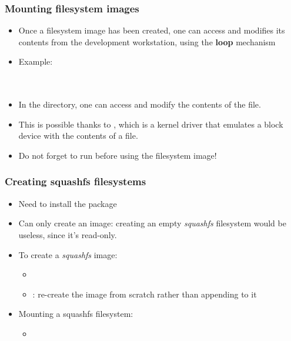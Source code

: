 \begin{frame}
  \frametitle{Mounting filesystem images}
  \begin{itemize}
  \item Once a filesystem image has been created, one can access and
    modifies its contents from the development workstation, using the
    {\bf loop} mechanism
  \item Example:\\
    \\
    \\
  \item In the  directory, one can access and modify
    the contents of the  file.
  \item This is possible thanks to , which is a kernel
    driver that emulates a block device with the contents of a file.
  \item Do not forget to run  before using the filesystem
    image!
  \end{itemize}
\end{frame}

\begin{frame}
  \frametitle{Creating squashfs filesystems}
  \begin{itemize}
  \item Need to install the  package
  \item Can only create an image: creating an empty {\em squashfs}
    filesystem would be useless, since it's read-only.
  \item To create a {\em squashfs} image:
    \begin{itemize}
    \item {}
    \item {}: re-create the image from scratch rather
      than appending to it
    \end{itemize}
  \item Mounting a squashfs filesystem:
    \begin{itemize}
    \item {}
    \end{itemize}
  \end{itemize}
\end{frame}

